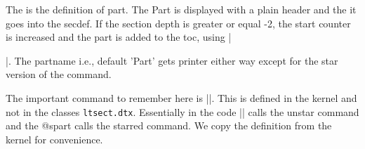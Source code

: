 \begin{multicols}{2}
The is the definition of part. The Part is displayed with a plain header and the it goes into the secdef. If the section depth is greater or equal -2, the start counter is increased and the part is added to the toc, using |\addcontentsline|. 
The partname i.e., default 'Part' gets printer either way except for the star version of the command.
\end{multicols}

\begin{teXXX}
\newcommand\part{%
  \if@openright
    \cleardoublepage
  \else
    \clearpage
  \fi
  \thispagestyle{plain}%
  \if@twocolumn
    \onecolumn
    \@tempswatrue
  \else
    \@tempswafalse
  \fi
  \null\vfil
  \secdef\@part\@spart}
\end{teXXX}

\begin{multicols}{2}
 The important command to remember here
is |\secdef|. This is defined in the kernel and not in the classes \texttt{ltsect.dtx}. Essentially in the code |\@part| calls the unstar command and the @spart calls the starred command. We copy the definition from the kernel for convenience.
\end{multicols}


